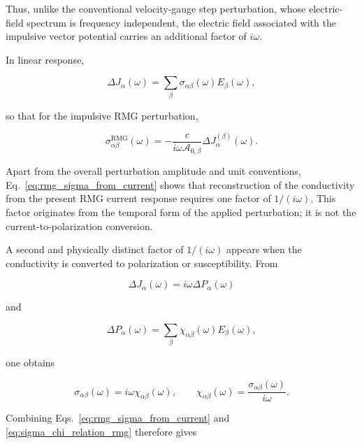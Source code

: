 Thus, unlike the conventional velocity-gauge step perturbation, whose
electric-field spectrum is frequency independent, the electric field
associated with the impulsive vector potential carries an additional
factor of $i\omega$.

In linear response,

\begin{equation}
\Delta J_{\alpha}(\omega)
=
\sum_{\beta}
\sigma_{\alpha\beta}(\omega)
E_{\beta}(\omega),
\label{eq:J_sigma_E_rmg}
\end{equation}

so that for the impulsive RMG perturbation,

\begin{equation}
\sigma_{\alpha\beta}^{\mathrm{RMG}}(\omega)
=
-\frac{c}
       {i\omega\mathcal{A}_{0,\beta}}
\Delta J_{\alpha}^{(\beta)}(\omega).
\label{eq:rmg_sigma_from_current}
\end{equation}

Apart from the overall perturbation amplitude and unit conventions,
Eq.~\eqref{eq:rmg_sigma_from_current} shows that reconstruction of the
conductivity from the present RMG current response requires one factor
of $1/(i\omega)$.  This factor originates from the temporal form of the
applied perturbation; it is not the current-to-polarization conversion.

A second and physically distinct factor of $1/(i\omega)$ appears when
the conductivity is converted to polarization or susceptibility.  From

\begin{equation}
\Delta J_{\alpha}(\omega)
=
i\omega\Delta P_{\alpha}(\omega)
\end{equation}

and

\begin{equation}
\Delta P_{\alpha}(\omega)
=
\sum_{\beta}
\chi_{\alpha\beta}(\omega)
E_{\beta}(\omega),
\end{equation}

one obtains

\begin{equation}
\sigma_{\alpha\beta}(\omega)
=
i\omega
\chi_{\alpha\beta}(\omega),
\qquad
\chi_{\alpha\beta}(\omega)
=
\frac{\sigma_{\alpha\beta}(\omega)}
     {i\omega}.
\label{eq:sigma_chi_relation_rmg}
\end{equation}

Combining Eqs.~\eqref{eq:rmg_sigma_from_current} and
\eqref{eq:sigma_chi_relation_rmg} therefore gives

